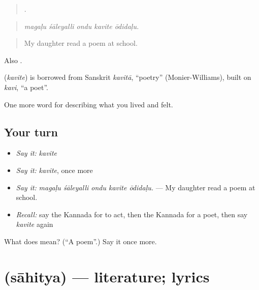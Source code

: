 \begin{quote}
    .
\end{quote}

\begin{quote}
\emph{magaḷu śāleyalli ondu kavite ōdidaḷu.}
\end{quote}

\begin{quote}
My daughter read a poem at school.
\end{quote}

Also .

\begin{cousinweb}
\textbf{} (\emph{kavite}) is borrowed from Sanskrit \emph{kavitā}, \textquotedblleft{}poetry\textquotedblright{} (Monier-Williams), built on \emph{kavi}, \textquotedblleft{}a poet\textquotedblright{}.
\end{cousinweb}

\begin{grammarlens}[title={What you've built}]
One more word for describing what you lived and felt.
\end{grammarlens}

\subsection*{Your turn}
\begin{itemize}
\raggedright
  \item \emph{Say it:} \emph{kavite}
  \item \emph{Say it:} \emph{kavite}, once more
  \item \emph{Say it:} \emph{magaḷu śāleyalli ondu kavite ōdidaḷu.} — My daughter read a poem at school.
  \item \emph{Recall:} say the Kannada for to act, then the Kannada for a poet, then say \emph{kavite} again
\end{itemize}

\begin{tcolorbox}[breakable,colback=teal!4,colframe=teal!35!black,title={Before you move on}]
What does  mean? (\textquotedblleft{}A poem\textquotedblright{}.) Say it once more.
\end{tcolorbox}
\section[\texorpdfstring{\kn{ಸಾಹಿತ್ಯ} (sāhitya)}{ಸಾಹಿತ್ಯ (sāhitya)}]{ (sāhitya) — literature; lyrics}


